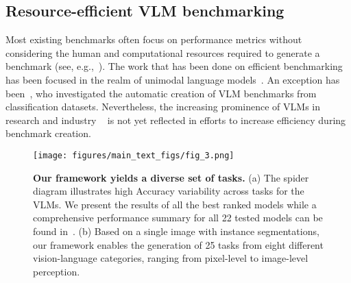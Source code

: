 \subsection{Resource-efficient VLM benchmarking}
Most existing benchmarks often focus on performance metrics without considering the human and computational resources required to generate a benchmark (see, e.g.,~\cite{fu2024blink,liu2024mmbench}). The work that has been done on efficient benchmarking has been focused in the realm of unimodal language models~\cite{polo2024tinybenchmarks, perlitz2023efficient}. An exception has been~\citet{ging2024open}, who investigated the automatic creation of VLM benchmarks from classification datasets. Nevertheless, the increasing prominence of VLMs in research and industry ~\cite{li2024multimodal, yang2023dawn} is not yet reflected in efforts to increase efficiency during benchmark creation.

\begin{figure*}[t]
    \centering
\texttt{[image: figures/main\_text\_figs/fig\_3.png]}
\caption{\textbf{Our framework yields a diverse set of tasks.} (a) The spider diagram illustrates high Accuracy variability across tasks for the VLMs. We present the results of all the best ranked models while a comprehensive performance summary for all 22 tested models can be found in~. (b) Based on a single image with instance segmentations, our framework enables the  generation of 25 tasks from eight different vision-language categories, ranging from pixel-level to image-level perception.}
    \label{fig:fig3}
\end{figure*}

